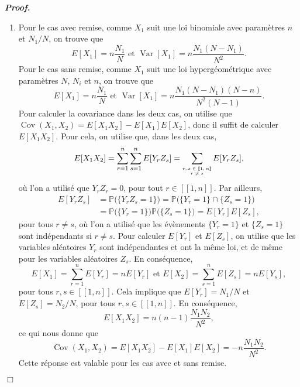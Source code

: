 \documentclass[11pt,a4paper]{article}
\newenvironment{preuve}[1][]
{\vskip 2mm  \noindent\emph{\bf Proof#1. }}{$\Box$ \vskip 2mm}
\begin{document}
\begin{preuve}
\begin{enumerate}
\begin{enumerate}[label=(\roman*)]
					\item Pour le cas avec remise, comme $X_{1}$ suit une loi binomiale avec paramètres $n$ et $N_{1}/N$, on trouve que 
					\[     E[X_{1}] = n \frac{N_{1}}{N} \text{ et }  \operatorname{Var}[X_{1}] = n \frac{N_{1}(N-N_{1})}{N^{2}}.     \]
					Pour le cas sans remise, comme $X_{1}$ suit une loi hypergéométrique avec paramètres $N$, $N_{i}$ et $n$, on trouve que 
					\[     E[X_{1}] = n \frac{N_{1}}{N} \text{ et }  \operatorname{Var}[X_{1}] = n \frac{N_{1}(N-N_{1})(N-n)}{N^{2}(N-1)}.     \]
					Pour calculer la covariance dans les deux cas, on utilise que $\operatorname{Cov}(X_{1},X_{2}) = E[X_{1} X_{2}] - E[X_{1}] E[X_{2}]$, donc 
					il suffit de calculer $E[X_{1} X_{2}]$. 
					Pour cela, on utilise que, dans les deux cas, 
					\[      E[X_{1} X_{2}] = \sum_{r=1}^{n} \sum_{s=1}^{n} E[Y_{r}Z_{s}] = \sum_{\text{\begin{tiny}$\begin{matrix}r, s \in [\![ 1, n ]\!] \\ r \neq s \end{matrix}$\end{tiny}}} E[Y_{r}Z_{s}],     \]
					où l'on a utilisé que $Y_{r}Z_{r} = 0$, pour tout $r \in [\![ 1, n ]\!]$. 
					Par ailleurs, 
					\begin{align*}
					E[Y_{r}Z_{s}] &= \mathbb{P}\big(\{Y_{r}Z_{s} = 1\}\big) = \mathbb{P}\big(\{Y_{r} = 1 \} \cap \{Z_{s} = 1\}\big) 
					\\
					&= 
					\mathbb{P}\big(\{Y_{r} = 1 \}\big) \mathbb{P}\big(\{Z_{s} = 1\}\big) = E[Y_{r}] E[Z_{s}],
					\end{align*}     
					pour tous $r \neq s$, où l'on a utilisé que les évènements $\{Y_{r} = 1 \}$ et $\{Z_{s} = 1\}$ sont indépendants si $r \neq s$. 
					Pour calculer $E[Y_{r}]$ et $E[Z_{s}]$, on utilise que les variables aléatoires $Y_{r}$ sont indépendantes et ont la même loi, et 
					de même pour les variables aléatoires $Z_{s}$. 
					En conséquence, 
					\[      E[X_{1}] = \sum_{r=1}^{n} E[Y_{r}] = n E[Y_{r}] \text{ et } E[X_{2}] = \sum_{s=1}^{n} E[Z_{s}] = n E[Y_{s}],    \]
					pour tous $r, s \in [\![ 1, n ]\!]$. 
					Cela implique que $E[Y_{r}] = N_{1}/N$ et $E[Z_{s}] = N_{2}/N$, pour tous $r, s \in [\![ 1, n ]\!]$. 
					En conséquence, 
					\[        E[X_{1}X_{2}] = n(n-1) \frac{N_{1} N_{2}}{N^{2}},     \]
					ce qui nous donne que 
					\[     \operatorname{Cov}(X_{1},X_{2}) = E[X_{1} X_{2}] - E[X_{1}] E[X_{2}] = -n \frac{N_{1} N_{2}}{N^{2}}.     \]
					Cette réponse est valable pour les cas avec et sans remise. 
				\end{enumerate}
			\end{enumerate}
		\end{preuve}
		
\end{document}
